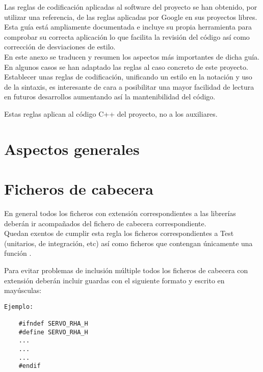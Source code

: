 Las reglas de codificación aplicadas al software del proyecto se han obtenido, por utilizar una referencia, de las reglas aplicadas por Google en sus proyectos libres. Esta guía está ampliamente documentada e incluye su propia herramienta para comprobar su correcta aplicación \completar lo que facilita la revisión del código así como corrección de desviaciones de estilo.
\\

En este anexo se traducen y resumen los aspectos más importantes de dicha guía. En algunos casos se han adaptado las reglas al caso concreto de este proyecto.
\\

Establecer unas reglas de codificación, unificando un estilo en la notación y uso de la sintaxis, es interesante de cara a posibilitar una mayor facilidad de lectura en futuros desarrollos aumentando así la mantenibilidad del código.

Estas reglas aplican al código C++ del proyecto, no a los  auxiliares.

\section{Aspectos generales} \label{sec:codificacionSW:general}

\section{Ficheros de cabecera} \label{sec:codificacionSW:cabeceras}

    En general todos los ficheros con extensión  correspondientes a las librerías deberán ir acompañados del fichero de cabecera  correspondiente.
    \\
    
    Quedan exentos de cumplir esta regla los ficheros correspondientes a Test (unitarios, de integración, etc) así como ficheros que contengan únicamente una función .


    Para evitar problemas de inclusión múltiple todos los ficheros de cabecera con extensión  deberán incluir guardas con el siguiente formato y escrito en mayúsculas:  
    \\ 
    
    \lstset{language=C, breaklines=true, basicstyle=\footnotesize}
    \begin{lstlisting}[frame=single]
Ejemplo:

    #ifndef SERVO_RHA_H
    #define SERVO_RHA_H
    ...
    ...
    ...
    #endif
    \end{lstlisting}
    
